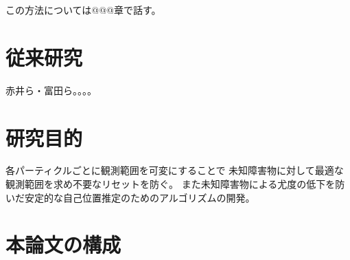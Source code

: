 この方法については@@@章で話す。

\section{従来研究}

赤井ら・富田ら。。。。

\section{研究目的}

各パーティクルごとに観測範囲を可変にすることで
未知障害物に対して最適な観測範囲を求め不要なリセットを防ぐ。
また未知障害物による尤度の低下を防いだ安定的な自己位置推定のためのアルゴリズムの開発。


\section{本論文の構成}







%
